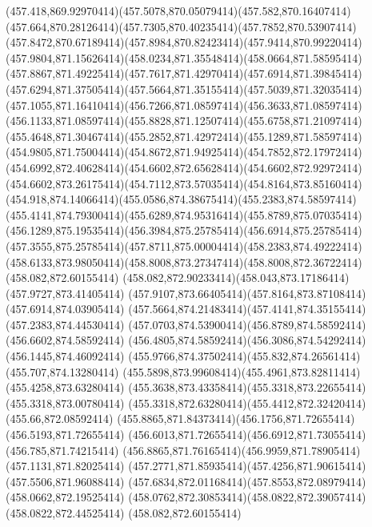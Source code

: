 {{	\curveto(457.418,869.92970414)(457.5078,870.05079414)(457.582,870.16407414)
	\curveto(457.664,870.28126414)(457.7305,870.40235414)(457.7852,870.53907414)
	\curveto(457.8472,870.67189414)(457.8984,870.82423414)(457.9414,870.99220414)
	\curveto(457.9804,871.15626414)(458.0234,871.35548414)(458.0664,871.58595414)
	\curveto(457.8867,871.49225414)(457.7617,871.42970414)(457.6914,871.39845414)
	\curveto(457.6294,871.37505414)(457.5664,871.35155414)(457.5039,871.32035414)
	\curveto(457.1055,871.16410414)(456.7266,871.08597414)(456.3633,871.08597414)
	\curveto(456.1133,871.08597414)(455.8828,871.12507414)(455.6758,871.21097414)
	\curveto(455.4648,871.30467414)(455.2852,871.42972414)(455.1289,871.58597414)
	\curveto(454.9805,871.75004414)(454.8672,871.94925414)(454.7852,872.17972414)
	\curveto(454.6992,872.40628414)(454.6602,872.65628414)(454.6602,872.92972414)
	\curveto(454.6602,873.26175414)(454.7112,873.57035414)(454.8164,873.85160414)
	\curveto(454.918,874.14066414)(455.0586,874.38675414)(455.2383,874.58597414)
	\curveto(455.4141,874.79300414)(455.6289,874.95316414)(455.8789,875.07035414)
	\curveto(456.1289,875.19535414)(456.3984,875.25785414)(456.6914,875.25785414)
	\curveto(457.3555,875.25785414)(457.8711,875.00004414)(458.2383,874.49222414)
	\curveto(458.6133,873.98050414)(458.8008,873.27347414)(458.8008,872.36722414)
	\closepath
	\moveto(458.082,872.60155414)
	\curveto(458.082,872.90233414)(458.043,873.17186414)(457.9727,873.41405414)
	\curveto(457.9107,873.66405414)(457.8164,873.87108414)(457.6914,874.03905414)
	\curveto(457.5664,874.21483414)(457.4141,874.35155414)(457.2383,874.44530414)
	\curveto(457.0703,874.53900414)(456.8789,874.58592414)(456.6602,874.58592414)
	\curveto(456.4805,874.58592414)(456.3086,874.54292414)(456.1445,874.46092414)
	\curveto(455.9766,874.37502414)(455.832,874.26561414)(455.707,874.13280414)
	\curveto(455.5898,873.99608414)(455.4961,873.82811414)(455.4258,873.63280414)
	\curveto(455.3638,873.43358414)(455.3318,873.22655414)(455.3318,873.00780414)
	\curveto(455.3318,872.63280414)(455.4412,872.32420414)(455.66,872.08592414)
	\curveto(455.8865,871.84373414)(456.1756,871.72655414)(456.5193,871.72655414)
	\curveto(456.6013,871.72655414)(456.6912,871.73055414)(456.785,871.74215414)
	\curveto(456.8865,871.76165414)(456.9959,871.78905414)(457.1131,871.82025414)
	\curveto(457.2771,871.85935414)(457.4256,871.90615414)(457.5506,871.96088414)
	\curveto(457.6834,872.01168414)(457.8553,872.08979414)(458.0662,872.19525414)
	\curveto(458.0762,872.30853414)(458.0822,872.39057414)(458.0822,872.44525414)
	\closepath
	\moveto(458.082,872.60155414)
}
}

